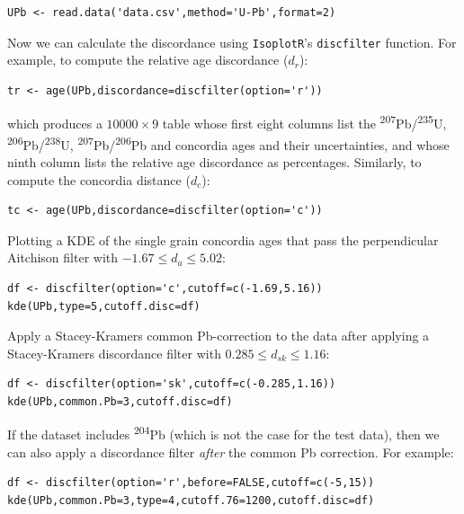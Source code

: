 \documentclass[gchron, manuscript]{copernicus}
\begin{document}
\begin{verbatim}
UPb <- read.data('data.csv',method='U-Pb',format=2)
\end{verbatim}

\noindent Now we can calculate the discordance using
\texttt{IsoplotR}'s \texttt{discfilter} function. For example, to
compute the relative age discordance ($d_r$):

\begin{verbatim}
tr <- age(UPb,discordance=discfilter(option='r'))
\end{verbatim}

\noindent which produces a ${10000}\times{9}$ table whose first eight
columns list the \textsuperscript{207}Pb/\textsuperscript{235}U,
\textsuperscript{206}Pb/\textsuperscript{238}U,
\textsuperscript{207}Pb/\textsuperscript{206}Pb and concordia ages and
their uncertainties, and whose ninth column lists the relative age
discordance as percentages. Similarly, to compute the concordia
distance ($d_c$):

\begin{verbatim}
tc <- age(UPb,discordance=discfilter(option='c'))
\end{verbatim}

\noindent Plotting a KDE of the single grain concordia ages that pass
the perpendicular Aitchison filter with ${-1.67}\leq{d_a}\leq{5.02}$:

\begin{verbatim}
df <- discfilter(option='c',cutoff=c(-1.69,5.16))
kde(UPb,type=5,cutoff.disc=df)
\end{verbatim}

\noindent Apply a Stacey-Kramers common Pb-correction to the data after
applying a Stacey-Kramers discordance filter with
${0.285}\leq{d_{sk}}\leq{1.16}$:

\begin{verbatim}
df <- discfilter(option='sk',cutoff=c(-0.285,1.16))
kde(UPb,common.Pb=3,cutoff.disc=df)
\end{verbatim}

\noindent If the dataset includes \textsuperscript{204}Pb (which is
not the case for the test data), then we can also apply a discordance
filter \textit{after} the common Pb correction. For example:

\begin{verbatim}
df <- discfilter(option='r',before=FALSE,cutoff=c(-5,15))
kde(UPb,common.Pb=3,type=4,cutoff.76=1200,cutoff.disc=df)
\end{verbatim}
\end{document}
